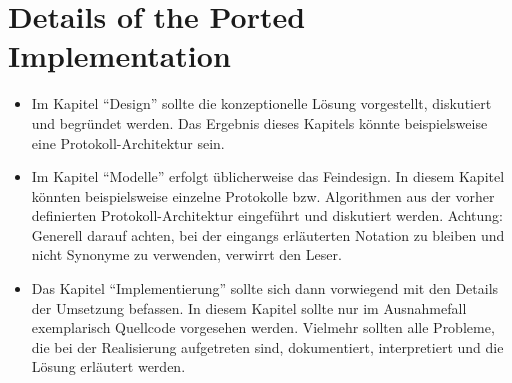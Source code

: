 \chapter{Details of the Ported Implementation}
\label{sec:problemdescription}

\begin{itemize}
	\item Im Kapitel \enquote{Design} sollte die konzeptionelle Lösung vorgestellt, diskutiert und begründet werden. Das Ergebnis dieses Kapitels könnte beispielsweise eine Protokoll-Architektur sein.
	\item Im Kapitel \enquote{Modelle} erfolgt üblicherweise das Feindesign. In diesem Kapitel könnten beispielsweise einzelne Protokolle bzw. Algorithmen aus der vorher definierten Protokoll-Architektur eingeführt und diskutiert werden. Achtung: Generell darauf achten, bei der eingangs erläuterten Notation zu bleiben und nicht Synonyme zu verwenden, verwirrt den Leser.
	\item Das Kapitel \enquote{Implementierung} sollte sich dann vorwiegend mit den Details der Umsetzung befassen. In diesem Kapitel sollte nur im Ausnahmefall exemplarisch Quellcode vorgesehen werden. Vielmehr sollten alle Probleme, die bei der Realisierung aufgetreten sind, dokumentiert, interpretiert und die Lösung erläutert werden.
\end{itemize}
